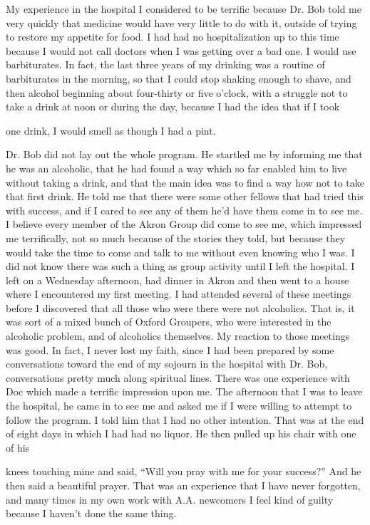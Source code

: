 \begin{biblechapter}
My experience in the hospital I considered to be terrific because Dr. Bob told me very quickly that medicine would have very little to do with it, outside of trying to restore my appetite for food. I had had no hospitalization up to this time because I would not call doctors when I was getting over a bad one. I would use barbiturates. In fact, the last three years of my drinking was a routine of barbiturates in the morning, so that I could stop shaking enough to shave, and then alcohol beginning about four-thirty or five o’clock, with a struggle not to take a drink at noon or during the day, because I had the idea that if I took

one drink, I would smell as though I had a pint.

Dr. Bob did not lay out the whole program. He startled me by informing me that he was an alcoholic, that he had found a way which so far enabled him to live without taking a drink, and that the main idea was to find a way how not to take that first drink. He told me that there were some other fellows that had tried this with success, and if I cared to see any of them he’d have them come in to see me. I believe every member of the Akron Group did come to see me, which impressed me terrifically, not so much because of the stories they told, but because they would take the time to come and talk to me without even knowing who I was. I did not know there was such a thing as group activity until I left the hospital. I left on a Wednesday afternoon, had dinner in Akron and then went to a house where I encountered my first meeting. I had attended several of these meetings before I discovered that all those who were there were not alcoholics. That is, it was sort of a mixed bunch of Oxford Groupers, who were interested in the alcoholic problem, and of alcoholics themselves. My reaction to those meetings was good. In fact, I never lost my faith, since I had been prepared by some conversations toward the end of my sojourn in the hospital with Dr. Bob, conversations pretty much along spiritual lines. There was one experience with Doc which made a terrific impression upon me. The afternoon that I was to leave the hospital, he came in to see me and asked me if I were willing to attempt to follow the program. I told him that I had no other intention. That was at the end of eight days in which I had had no liquor. He then pulled up his chair with one of his

knees touching mine and said, “Will you pray with me for your success?” And he then said a beautiful prayer. That was an experience that I have never forgotten, and many times in my own work with A.A. newcomers I feel kind of guilty because I haven’t done the same thing.


\end{biblechapter}
